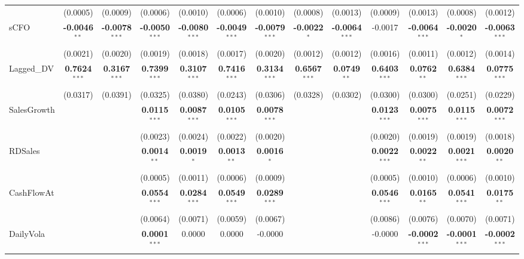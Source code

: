 \documentclass[11pt,a4paper]{article}
\begin{document}
\begin{table}[htbp]
\begin{tabular}{lcccccccccccc}
 & (0.0005) & (0.0009) & (0.0006) & (0.0010) & (0.0006) & (0.0010) & (0.0008) & (0.0013) & (0.0009) & (0.0013) & (0.0008) & (0.0012) \\
sCFO & \textbf{-0.0046}$^{**}$ & \textbf{-0.0078}$^{***}$ & \textbf{-0.0050}$^{***}$ & \textbf{-0.0080}$^{***}$ & \textbf{-0.0049}$^{***}$ & \textbf{-0.0079}$^{***}$ & \textbf{-0.0022}$^{*}$ & \textbf{-0.0064}$^{***}$ & -0.0017 & \textbf{-0.0064}$^{***}$ & \textbf{-0.0020}$^{*}$ & \textbf{-0.0063}$^{***}$ \\
 & (0.0021) & (0.0020) & (0.0019) & (0.0018) & (0.0017) & (0.0020) & (0.0012) & (0.0012) & (0.0016) & (0.0011) & (0.0012) & (0.0014) \\
Lagged\_DV & \textbf{0.7624}$^{***}$ & \textbf{0.3167}$^{***}$ & \textbf{0.7399}$^{***}$ & \textbf{0.3107}$^{***}$ & \textbf{0.7416}$^{***}$ & \textbf{0.3134}$^{***}$ & \textbf{0.6567}$^{***}$ & \textbf{0.0749}$^{**}$ & \textbf{0.6403}$^{***}$ & \textbf{0.0762}$^{**}$ & \textbf{0.6384}$^{***}$ & \textbf{0.0775}$^{***}$ \\
 & (0.0317) & (0.0391) & (0.0325) & (0.0380) & (0.0243) & (0.0306) & (0.0328) & (0.0302) & (0.0300) & (0.0300) & (0.0251) & (0.0229) \\
SalesGrowth &  &  & \textbf{0.0115}$^{***}$ & \textbf{0.0087}$^{***}$ & \textbf{0.0105}$^{***}$ & \textbf{0.0078}$^{***}$ &  &  & \textbf{0.0123}$^{***}$ & \textbf{0.0075}$^{***}$ & \textbf{0.0115}$^{***}$ & \textbf{0.0072}$^{***}$ \\
 &  &  & (0.0023) & (0.0024) & (0.0022) & (0.0020) &  &  & (0.0020) & (0.0019) & (0.0019) & (0.0018) \\
RDSales &  &  & \textbf{0.0014}$^{**}$ & \textbf{0.0019}$^{*}$ & \textbf{0.0013}$^{**}$ & \textbf{0.0016}$^{*}$ &  &  & \textbf{0.0022}$^{***}$ & \textbf{0.0022}$^{**}$ & \textbf{0.0021}$^{***}$ & \textbf{0.0020}$^{**}$ \\
 &  &  & (0.0005) & (0.0011) & (0.0006) & (0.0009) &  &  & (0.0005) & (0.0010) & (0.0006) & (0.0010) \\
CashFlowAt &  &  & \textbf{0.0554}$^{***}$ & \textbf{0.0284}$^{***}$ & \textbf{0.0549}$^{***}$ & \textbf{0.0289}$^{***}$ &  &  & \textbf{0.0546}$^{***}$ & \textbf{0.0165}$^{**}$ & \textbf{0.0541}$^{***}$ & \textbf{0.0175}$^{**}$ \\
 &  &  & (0.0064) & (0.0071) & (0.0059) & (0.0067) &  &  & (0.0086) & (0.0076) & (0.0070) & (0.0071) \\
DailyVola &  &  & \textbf{0.0001}$^{***}$ & 0.0000 & 0.0000 & -0.0000 &  &  & -0.0000 & \textbf{-0.0002}$^{***}$ & \textbf{-0.0001}$^{***}$ & \textbf{-0.0002}$^{***}$ \\

\end{tabular}
\end{table}
\end{document}
